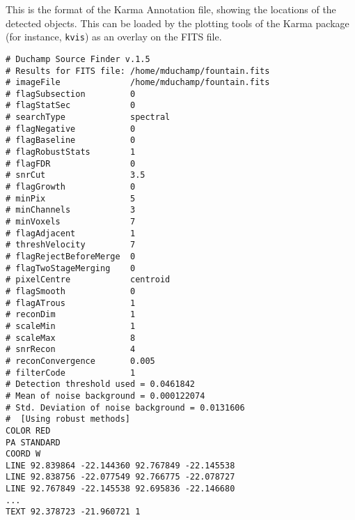 %
%
%
%
\label{app-karma}

This is the format of the Karma Annotation file, showing the locations
of the detected objects. This can be loaded by the plotting tools of
the Karma package (for instance, \texttt{kvis}) as an overlay on the FITS
file.

\begin{verbatim}
# Duchamp Source Finder v.1.5
# Results for FITS file: /home/mduchamp/fountain.fits
# imageFile              /home/mduchamp/fountain.fits
# flagSubsection         0
# flagStatSec            0
# searchType             spectral
# flagNegative           0
# flagBaseline           0
# flagRobustStats        1
# flagFDR                0
# snrCut                 3.5
# flagGrowth             0
# minPix                 5
# minChannels            3
# minVoxels              7
# flagAdjacent           1
# threshVelocity         7
# flagRejectBeforeMerge  0
# flagTwoStageMerging    0
# pixelCentre            centroid
# flagSmooth             0
# flagATrous             1
# reconDim               1
# scaleMin               1
# scaleMax               8
# snrRecon               4
# reconConvergence       0.005
# filterCode             1
# Detection threshold used = 0.0461842
# Mean of noise background = 0.000122074
# Std. Deviation of noise background = 0.0131606
#  [Using robust methods]
COLOR RED
PA STANDARD
COORD W
LINE 92.839864 -22.144360 92.767849 -22.145538
LINE 92.838756 -22.077549 92.766775 -22.078727
LINE 92.767849 -22.145538 92.695836 -22.146680
...
TEXT 92.378723 -21.960721 1
\end{verbatim}

